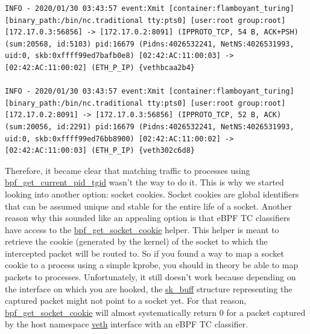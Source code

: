 
\begin{lstlisting}[language={},style=logStyle,caption={Example of two network packets that eBPF mistakenly mapped to the same process and container.},label={lst:ProcessLevelNetworkSecurityMonitoring:traffic1}]
INFO - 2020/01/30 03:43:57 event:Xmit [container:flamboyant_turing] [binary_path:/bin/nc.traditional tty:pts0] [user:root group:root] [172.17.0.3:56856] -> [172.17.0.2:8091] (IPPROTO_TCP, 54 B, ACK+PSH) (sum:20568, id:5103) pid:16679 (Pidns:4026532241, NetNS:4026531993, uid:0, skb:0xffff99ed7bafb0e8) [02:42:AC:11:00:03] -> [02:42:AC:11:00:02] (ETH_P_IP) {vethbcaa2b4}

INFO - 2020/01/30 03:43:57 event:Xmit [container:flamboyant_turing] [binary_path:/bin/nc.traditional tty:pts0] [user:root group:root] [172.17.0.2:8091] -> [172.17.0.3:56856] (IPPROTO_TCP, 52 B, ACK) (sum:20056, id:2291) pid:16679 (Pidns:4026532241, NetNS:4026531993, uid:0, skb:0xffff99ed76bb8900) [02:42:AC:11:00:02] -> [02:42:AC:11:00:03] (ETH_P_IP) {veth302c6d8}
\end{lstlisting}

Therefore, it became clear that matching traffic to processes using \url{bpf_get_current_pid_tgid} wasn’t the way to do it. This is why we started looking into another option: socket cookies. Socket cookies are global identifiers that can be assumed unique and stable for the entire life of a socket. Another reason why this sounded like an appealing option is that eBPF TC classifiers have access to the \url{bpf_get_socket_cookie} helper. This helper is meant to retrieve the cookie (generated by the kernel) of the socket to which the intercepted packet will be routed to. So if you found a way to map a socket cookie to a process using a simple kprobe, you should in theory be able to map packets to processes. Unfortunately, it still doesn’t work because depending on the interface on which you are hooked, the \url{sk_buff} structure representing the captured packet might not point to a socket yet. For that reason, \url{bpf_get_socket_cookie} will almost systematically return 0 for a packet captured by the host namespace \url{veth} interface with an eBPF TC classifier.

